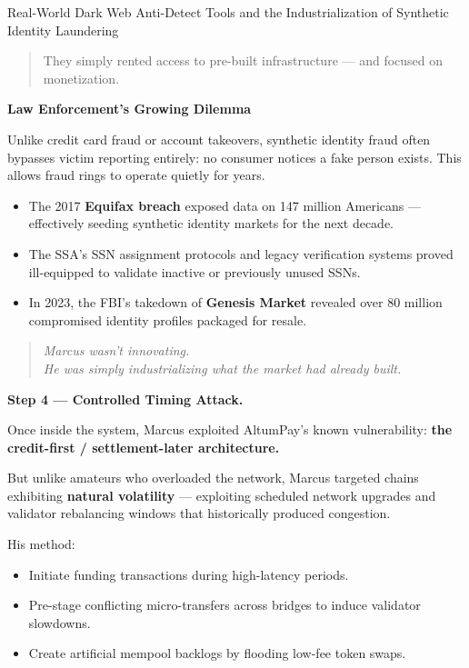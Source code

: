 \begin{HistoricalSidebar}{Real-World Dark Web Anti-Detect Tools and the Industrialization of Synthetic Identity Laundering}
\begin{quote}
    They simply rented access to pre-built infrastructure — and focused on monetization.
    \end{quote}
    
    \medskip
    
    \textbf{Law Enforcement's Growing Dilemma}
    
    Unlike credit card fraud or account takeovers, synthetic identity fraud often bypasses victim reporting entirely: no consumer notices a fake person exists. This allows fraud rings to operate quietly for years.
    
    \begin{itemize}
        \item The 2017 \textbf{Equifax breach} exposed data on 147 million Americans — effectively seeding synthetic identity markets for the next decade.
        \item The SSA's SSN assignment protocols and legacy verification systems proved ill-equipped to validate inactive or previously unused SSNs.
        \item In 2023, the FBI's takedown of \textbf{Genesis Market} revealed over 80 million compromised identity profiles packaged for resale.
    \end{itemize}
    
    \begin{quote}
    \textit{Marcus wasn’t innovating.} \\
    \textit{He was simply industrializing what the market had already built.}
    \end{quote}
    
\end{HistoricalSidebar}
    

\medskip

\textbf{Step 4 — Controlled Timing Attack.}

Once inside the system, Marcus exploited AltumPay’s known vulnerability:
\textbf{the credit-first / settlement-later architecture.}

But unlike amateurs who overloaded the network, Marcus targeted chains exhibiting \textbf{natural volatility} — exploiting scheduled network upgrades and validator rebalancing windows that historically produced congestion.

\medskip

His method:

\begin{itemize}
\item Initiate funding transactions during high-latency periods.
\item Pre-stage conflicting micro-transfers across bridges to induce validator slowdowns.
\item Create artificial mempool backlogs by flooding low-fee token swaps.
\end{itemize}

